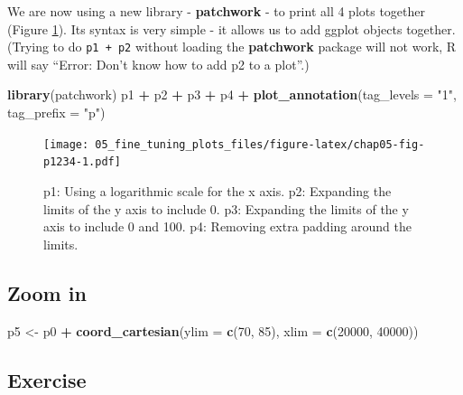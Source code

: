 \documentclass[
  12pt,
  krantz2]{krantz}
\makeatletter
\newenvironment{Shaded}{\begin{snugshade}}{\end{snugshade}}
\newcommand{\DataTypeTok}[1]{\textcolor[rgb]{0.13,0.29,0.53}{#1}}
\newcommand{\DecValTok}[1]{\textcolor[rgb]{0.00,0.00,0.81}{#1}}
\newcommand{\KeywordTok}[1]{\textcolor[rgb]{0.13,0.29,0.53}{\textbf{#1}}}
\newcommand{\NormalTok}[1]{#1}
\newcommand{\OperatorTok}[1]{\textcolor[rgb]{0.81,0.36,0.00}{\textbf{#1}}}
\newcommand{\StringTok}[1]{\textcolor[rgb]{0.31,0.60,0.02}{#1}}
\newenvironment{kframe}{%
\medskip{}
\setlength{\fboxsep}{.8em}
 \def\at@end@of@kframe{}%
 \ifinner\ifhmode%
  \def\at@end@of@kframe{\end{minipage}}%
  \begin{minipage}{\columnwidth}%
 \fi\fi%
 \def\FrameCommand##1{\hskip\@totalleftmargin \hskip-\fboxsep
 \colorbox{shadecolor}{##1}\hskip-\fboxsep
     \hskip-\linewidth \hskip-\@totalleftmargin \hskip\columnwidth}%
 \MakeFramed {\advance\hsize-\width
   \@totalleftmargin\z@ \linewidth\hsize
   \@setminipage}}%
 {\par\unskip\endMakeFramed%
 \at@end@of@kframe}
\renewenvironment{Shaded}{\begin{kframe}}{\end{kframe}}
\makeatother
\begin{document}
We are now using a new library - \textbf{patchwork} - to print all 4 plots together (Figure \ref{fig:chap05-fig-p1234}).
Its syntax is very simple - it allows us to add ggplot objects together.
(Trying to do \texttt{p1\ +\ p2} without loading the \textbf{patchwork} package will not work, R will say ``Error: Don't know how to add p2 to a plot''.)

\begin{Shaded}
\begin{Highlighting}[]
\KeywordTok{library}\NormalTok{(patchwork)}
\NormalTok{p1 }\OperatorTok{+}\StringTok{ }\NormalTok{p2 }\OperatorTok{+}\StringTok{ }\NormalTok{p3 }\OperatorTok{+}\StringTok{ }\NormalTok{p4 }\OperatorTok{+}\StringTok{ }\KeywordTok{plot_annotation}\NormalTok{(}\DataTypeTok{tag_levels =} \StringTok{"1"}\NormalTok{, }\DataTypeTok{tag_prefix =} \StringTok{"p"}\NormalTok{)}
\end{Highlighting}
\end{Shaded}

\begin{figure}
\centering
\texttt{[image: 05\_fine\_tuning\_plots\_files/figure-latex/chap05-fig-p1234-1.pdf]}
\caption{\label{fig:chap05-fig-p1234}p1: Using a logarithmic scale for the x axis. p2: Expanding the limits of the y axis to include 0. p3: Expanding the limits of the y axis to include 0 and 100. p4: Removing extra padding around the limits.}
\end{figure}

\hypertarget{zoom-in}{%
\subsection{Zoom in}\label{zoom-in}}


\begin{Shaded}
\begin{Highlighting}[]
\NormalTok{p5 <-}\StringTok{ }\NormalTok{p0 }\OperatorTok{+}
\StringTok{  }\KeywordTok{coord_cartesian}\NormalTok{(}\DataTypeTok{ylim =} \KeywordTok{c}\NormalTok{(}\DecValTok{70}\NormalTok{, }\DecValTok{85}\NormalTok{), }\DataTypeTok{xlim =} \KeywordTok{c}\NormalTok{(}\DecValTok{20000}\NormalTok{, }\DecValTok{40000}\NormalTok{)) }
\end{Highlighting}
\end{Shaded}

\hypertarget{exercise}{%
\subsection{Exercise}\label{exercise}}
\end{document}
